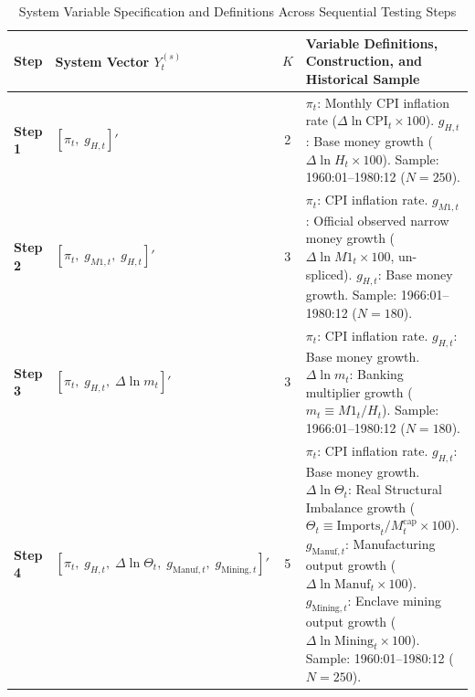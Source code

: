 \begin{table}[htbp]
\centering
\small
\renewcommand{\arraystretch}{0.88}
\caption{System Variable Specification and Definitions Across Sequential Testing Steps}
\label{tab:system_definitions}
\begin{tabularx}{\textwidth}{llc>{\RaggedRight}X}
\toprule
\textbf{Step} & \textbf{System Vector $Y^{(s)}_t$} & \textbf{$K$} & \textbf{Variable Definitions, Construction, and Historical Sample} \\
\midrule
\textbf{Step 1} & $[\pi_t, \; g_{H,t}]'$ & 2 & $\pi_t$: Monthly CPI inflation rate ($\Delta \ln \text{CPI}_t \times 100$). \newline $g_{H,t}$: Base money growth ($\Delta \ln H_t \times 100$). \newline Sample: 1960:01--1980:12 ($N=250$). \\
\addlinespace[0.3em]
\textbf{Step 2} & $[\pi_t, \; g_{M1,t}, \; g_{H,t}]'$ & 3 & $\pi_t$: CPI inflation rate. \newline $g_{M1,t}$: Official observed narrow money growth ($\Delta \ln M1_t \times 100$, un-spliced). \newline $g_{H,t}$: Base money growth. \newline Sample: 1966:01--1980:12 ($N=180$). \\
\addlinespace[0.3em]
\textbf{Step 3} & $[\pi_t, \; g_{H,t}, \; \Delta \ln m_t]'$ & 3 & $\pi_t$: CPI inflation rate. \newline $g_{H,t}$: Base money growth. \newline $\Delta \ln m_t$: Banking multiplier growth ($m_t \equiv M1_t / H_t$). \newline Sample: 1966:01--1980:12 ($N=180$). \\
\addlinespace[0.3em]
\textbf{Step 4} & $[\pi_t, \; g_{H,t}, \; \Delta \ln \Theta_t, \; g_{\text{Manuf},t}, \; g_{\text{Mining},t}]'$ & 5 & $\pi_t$: CPI inflation rate. \newline $g_{H,t}$: Base money growth. \newline $\Delta \ln \Theta_t$: Real Structural Imbalance growth ($\Theta_t \equiv \text{Imports}_t / M^{\text{cap}}_t \times 100$). \newline $g_{\text{Manuf},t}$: Manufacturing output growth ($\Delta \ln \text{Manuf}_t \times 100$). \newline $g_{\text{Mining},t}$: Enclave mining output growth ($\Delta \ln \text{Mining}_t \times 100$). \newline Sample: 1960:01--1980:12 ($N=250$). \\

\end{tabularx}
\end{table}
